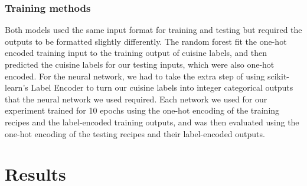 \documentclass[11pt]{article}
\begin{document}
\subsubsection{Training methods}
Both models used the same input format for training and testing but required the outputs to be formatted slightly differently. The random forest fit
the one-hot encoded training input to the training output of cuisine labels, and then predicted the cuisine labels for our testing inputs, which
were also one-hot encoded. For the neural network, we had to take the extra step of using scikit-learn's Label Encoder to turn our cuisine labels into integer categorical outputs that the neural network we used required.  Each network we used
for our experiment trained for 10 epochs using the one-hot encoding of the training recipes and the label-encoded training outputs, and was then evaluated using the one-hot encoding of the testing recipes and their label-encoded outputs.

\section{Results}



\end{document}
